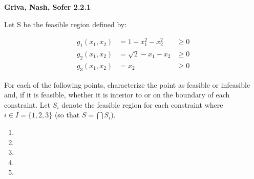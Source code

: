 \textbf{Griva, Nash, Sofer 2.2.1}

Let S be the feasible region defined by:

\begin{align*}
  g_1(x_1, x_2) &= 1 - x_1^2 - x_2^2 &\ge 0 \\
  g_2(x_1, x_2) &= \sqrt{2} - x_1 - x_2 &\ge 0 \\
  g_3(x_1, x_2) &= x_2 &\ge 0
\end{align*}

For each of the following points, characterize the point as feasible or infeasible and, if it
is feasible, whether it is interior to or on the boundary of each constraint. Let $S_i$ denote
the feasible region for each constraint where $i \in I = \{1, 2, 3\}$ (so that $S = \bigcap S_i$).
\begin{enumerate}
  \item 
  \item 
  \pagebreak
  \item 
  \item 
  \item 
\end{enumerate}